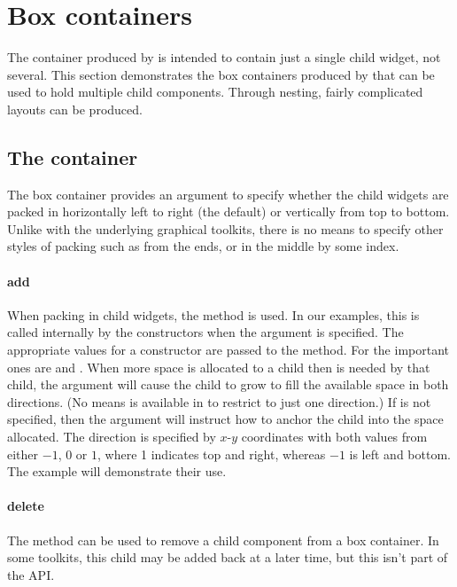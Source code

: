 \section{Box containers}
\label{sec:gWidgets-box-containers}

The container produced by  is intended to contain
just a single child widget, not several. This section demonstrates the
box containers produced by  that can be used to
hold multiple child components. Through nesting, fairly complicated
layouts can be produced.

\subsection{The  container}
\label{sec:gWidgets-ggroup-container}
  
The  box container provides an argument
 to specify whether the child widgets
are packed in horizontally left to right (the default) or vertically
from top to bottom. Unlike with the underlying graphical toolkits,
there is no means to specify other styles of packing such as from the
ends, or in the middle by some index.

\paragraph{add}
When packing in child widgets, the  method is
used. In our examples, this is called internally by the constructors
when the  argument is specified. The appropriate
  values for a constructor are passed to the 
method. For  the important ones are 
and . When more space is allocated to a child then is
needed by that child, the  argument will cause the
child to grow to fill the available space in both directions. (No
means is available in  to restrict to just one
direction.) If  is not specified, then the
 argument will instruct how to anchor the child into the
space allocated. The direction is specified by $x$-$y$ coordinates
with both values from either $-1$, 0 or $1$, where 1 indicates top and
right, whereas $-1$ is left and bottom. The example will demonstrate
their use.

\paragraph{delete}
The  method can be used to remove a child
component from a box container. In some toolkits, this child may be
added back at a later time, but this isn't part of the API. 

